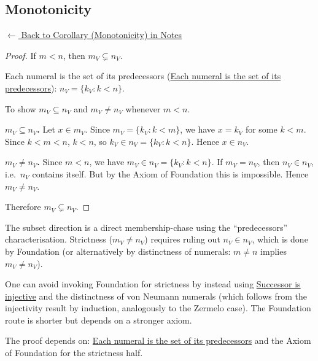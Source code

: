 
\subsection*{Monotonicity}
\label{prf:vn-monotone}

\begin{remark*}[Return]
\hyperref[cor:vn-monotone]{$\leftarrow$ Back to Corollary (Monotonicity) in Notes}
\end{remark*}

\begin{proof}
\Claim If $m < n$, then $m_V \subsetneq n_V$.

\Given Each numeral is the set of its predecessors
(\hyperref[cor:vn-predecessors]{Each numeral is the set of its predecessors}):
$n_V = \{k_V : k < n\}$.

\Goal To show $m_V \subseteq n_V$ and $m_V \neq n_V$ whenever $m < n$.

\medskip
\noindent\textbf{$m_V \subseteq n_V$.} Let $x \in m_V$. Since $m_V = \{k_V :
k < m\}$, we have $x = k_V$ for some $k < m$. Since $k < m < n$, $k < n$, so
$k_V \in n_V = \{k_V : k < n\}$. Hence $x \in n_V$.

\medskip
\noindent\textbf{$m_V \neq n_V$.} Since $m < n$, we have $m_V \in n_V = \{k_V
: k < n\}$. If $m_V = n_V$, then $n_V \in n_V$, i.e.\ $n_V$ contains itself.
But by the Axiom of Foundation this is impossible. Hence $m_V \neq n_V$.

Therefore $m_V \subsetneq n_V$. \AsReq
\end{proof}

\begin{remark*}
The subset direction is a direct membership-chase using the ``predecessors''
characterisation. Strictness ($m_V \neq n_V$) requires ruling out $n_V \in
n_V$, which is done by Foundation (or alternatively by distinctness of
numerals: $m \neq n$ implies $m_V \neq n_V$).
\end{remark*}

\begin{remark*}
One can avoid invoking Foundation for strictness by instead using
\hyperref[prop:vn-successor-injective]{Successor is injective} and the
distinctness of von Neumann numerals (which follows from the injectivity result
by induction, analogously to the Zermelo case). The Foundation route is shorter
but depends on a stronger axiom.
\end{remark*}

\begin{remark*}[Dependencies]
The proof depends on: \hyperref[cor:vn-predecessors]{Each numeral is the set of
its predecessors} and the Axiom of Foundation for the strictness half.
\end{remark*}
